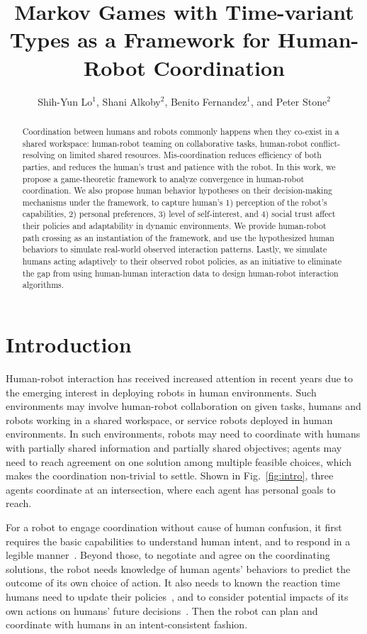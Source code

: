 \documentclass[letterpaper, 10 pt, conference]{ieeeconf}  %
\title{\LARGE \bf
Markov Games with Time-variant Types as a Framework for Human-Robot Coordination
}
\author{Shih-Yun Lo$^{1}$, Shani Alkoby$^{2}$, Benito Fernandez$^{1}$, and Peter Stone$^{2}$%
}
\begin{document}
\maketitle
\thispagestyle{empty}
\pagestyle{empty}
\begin{abstract}
  Coordination between humans and robots commonly happens when they 
  co-exist in a shared workspace: human-robot teaming on collaborative tasks, 
  human-robot conflict-resolving on limited shared resources. Mis-coordination 
  reduces 
  efficiency of both parties, and reduces the human's trust and patience with 
  the robot. In this work, we propose a game-theoretic framework to analyze 
  convergence in 
  human-robot coordination.
  We also propose human behavior hypotheses on their 
  decision-making mechanisms under the framework, 
  to capture human's 1) perception of the robot's capabilities, 2) personal preferences, 3) level of self-interest, and 4) social 
  trust affect their policies and adaptability in dynamic environments. 
  We provide human-robot path crossing as an instantiation of the framework, and use the 
  hypothesized human behaviors to simulate real-world observed interaction 
  patterns. Lastly, we simulate humans acting adaptively to their observed robot 
  policies, as an initiative to eliminate the gap from using human-human 
  interaction data to design human-robot interaction algorithms. 
\end{abstract}
\vspace{-.2em}
\section{Introduction}
\vspace{-.2em}
Human-robot interaction has received increased attention in recent years due to the 
emerging interest in deploying robots in human environments. Such 
environments may involve human-robot collaboration on given tasks, 
humans and robots working in a shared workspace, or service 
robots deployed in human environments. In such environments, robots 
may need to coordinate with humans with partially shared information and 
partially shared objectives; agents may need to reach agreement on one 
solution among multiple feasible choices, which makes the coordination non-trivial to 
settle. Shown in Fig.~\ref{fig:intro}, three agents coordinate at an 
intersection, where each agent has personal goals to reach. 

For a robot to engage coordination without cause of human confusion, it first 
requires the basic capabilities to understand human intent, and to respond in a 
legible manner~\cite{dragan2013legibility}. Beyond those, to negotiate and agree on the coordinating 
solutions, the robot needs knowledge of human agents' behaviors to 
predict the outcome of its own choice of action. 
It also needs to known the reaction time humans need 
to update their policies~\cite{shah2011improved}, and to consider potential 
impacts of its own actions on humans' future 
decisions~\cite{fujiwara2015non,foerster2017learning}. Then the 
robot can plan and coordinate with humans in an intent-consistent fashion. 
\end{document}
